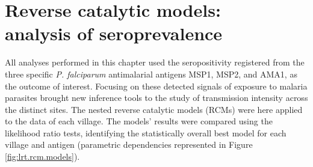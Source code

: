 \chapter[Reverse catalytic models: analysis of seroprevalence]{Reverse catalytic models:\\ analysis of seroprevalence}
\label{ch:5.0}

All analyses performed in this chapter used the seropositivity registered from the three specific \textit{P. falciparum} antimalarial antigens MSP1, MSP2, and AMA1, as the outcome of interest.
Focusing on these detected signals of exposure to malaria parasites brought new inference tools to the study of transmission intensity across the distinct sites.
The nested reverse catalytic models (RCMs) were here applied to the data of each village.
The models' results were compared using the likelihood ratio tests, identifying the statistically overall best model for each village and antigen (parametric dependencies represented in Figure \ref{fig:lrt.rcm.models}).

